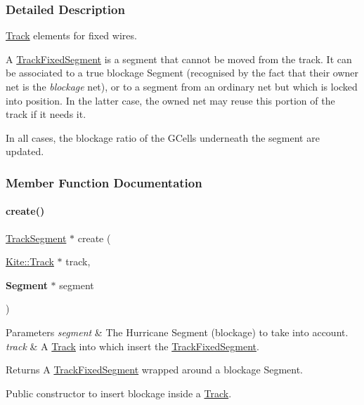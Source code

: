 \subsubsection{Detailed Description}
\hyperlink{classKite_1_1Track}{Track} elements for fixed wires. 

A \hyperlink{classKite_1_1TrackFixedSegment}{Track\+Fixed\+Segment} is a segment that cannot be moved from the track. It can be associated to a true blockage Segment (recognised by the fact that their owner net is the {\itshape blockage} net), or to a segment from an ordinary net but which is locked into position. In the latter case, the owned net may reuse this portion of the track if it needs it.

In all cases, the blockage ratio of the G\+Cells underneath the segment are updated. 

\subsubsection{Member Function Documentation}
\mbox{\label{classKite_1_1TrackFixedSegment_a7b548c2078a8d380b37ca12a96aa979d}} 
\paragraph{\texorpdfstring{create()}{create()}}
{\footnotesize\ttfamily \hyperlink{classKite_1_1TrackSegment}{Track\+Segment} $\ast$ create (\begin{DoxyParamCaption}\item[{\hyperlink{classKite_1_1Track}{Kite\+::\+Track} $\ast$}]{track,  }\item[{\textbf{ Segment} $\ast$}]{segment }\end{DoxyParamCaption})\hspace{0.3cm}{\ttfamily [static]}}


\begin{DoxyParams}{Parameters}
{\em segment} & The Hurricane Segment (blockage) to take into account. \\
\hline
{\em track} & A \hyperlink{classKite_1_1Track}{Track} into which insert the \hyperlink{classKite_1_1TrackFixedSegment}{Track\+Fixed\+Segment}. \\
\hline
\end{DoxyParams}
\begin{DoxyReturn}{Returns}
A \hyperlink{classKite_1_1TrackFixedSegment}{Track\+Fixed\+Segment} wrapped around a blockage Segment.
\end{DoxyReturn}
Public constructor to insert blockage inside a \hyperlink{classKite_1_1Track}{Track}. \mbox{\label{classKite_1_1TrackFixedSegment_a21b9cefd33ae22e4c2070ad441bdd30b}} 
